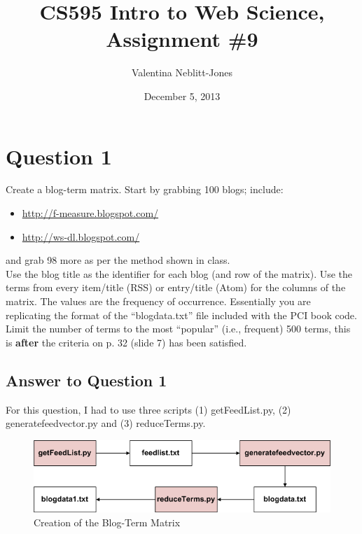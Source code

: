 \documentclass{article}
\begin{document}
\title{CS595 Intro to Web Science, Assignment \#9}
\author{Valentina Neblitt-Jones}
\date{December 5, 2013}
\maketitle

\newpage
\listoftables
\lstlistoflistings
\listoffigures

\newpage
\section*{Question 1}

Create a blog-term matrix. Start by grabbing 100 blogs; include: \\

\begin{itemize}
\item \url{http://f-measure.blogspot.com/}
\item \url{http://ws-dl.blogspot.com/}
\end{itemize}

and grab 98 more as per the method shown in class. \\

Use the blog title as the identifier for each blog (and row of the matrix). Use the terms from every item/title (RSS) or entry/title (Atom) for the columns of the matrix. The values are the frequency of occurrence. Essentially you are replicating the format of the ``blogdata.txt'' file included with the PCI book code. Limit the number of terms to the most ``popular'' (i.e., frequent) 500 terms, this is \textbf{after} the criteria on p. 32 (slide 7) has been satisfied.

\subsection*{Answer to Question 1}
For this question, I had to use three scripts (1) getFeedList.py, (2) generatefeedvector.py and (3) reduceTerms.py. 
\begin{figure}[H]
\centering
\includegraphics[scale=0.50]{q01/FlowForQ1}
\caption{Creation of the Blog-Term Matrix}
\label{FlowForQ1}
\end{figure}
\end{document}
